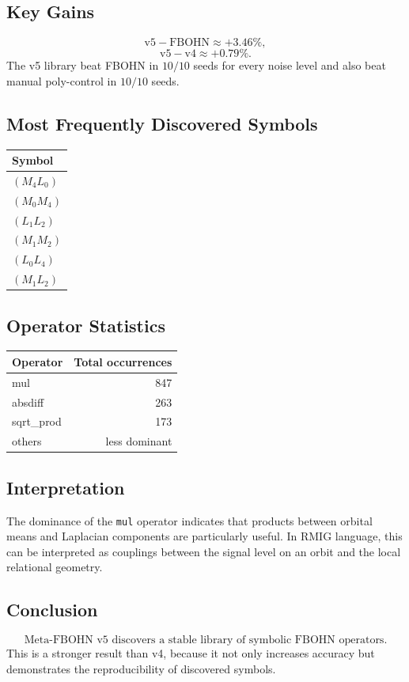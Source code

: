 \documentclass[11pt,a4paper]{report}
\begin{document}
\subsection{Key Gains}
\[
\text{v5}-\text{FBOHN}\approx +3.46\%,
\]
\[
\text{v5}-\text{v4}\approx +0.79\%.
\]
The v5 library beat FBOHN in $10/10$ seeds for every noise level and also beat manual poly-control in $10/10$ seeds.

\subsection{Most Frequently Discovered Symbols}
\begin{center}
\begin{tabular}{l}
\toprule
Symbol\\
\midrule
$(M_4L_0)$\\
$(M_0M_4)$\\
$(L_1L_2)$\\
$(M_1M_2)$\\
$(L_0L_4)$\\
$(M_1L_2)$\\
\bottomrule
\end{tabular}
\end{center}

\subsection{Operator Statistics}
\begin{center}
\begin{tabular}{lr}
\toprule
Operator & Total occurrences\\
\midrule
mul & 847\\
absdiff & 263\\
sqrt\_prod & 173\\
others & less dominant\\
\bottomrule
\end{tabular}
\end{center}

\subsection{Interpretation}
The dominance of the \texttt{mul} operator indicates that products between orbital means and Laplacian components are particularly useful. In RMIG language, this can be interpreted as couplings between the signal level on an orbit and the local relational geometry.

\subsection{Conclusion}
\[
\boxed{\text{Meta-FBOHN v5 discovers a stable library of symbolic FBOHN operators.}}
\]
This is a stronger result than v4, because it not only increases accuracy but demonstrates the reproducibility of discovered symbols.
\end{document}
